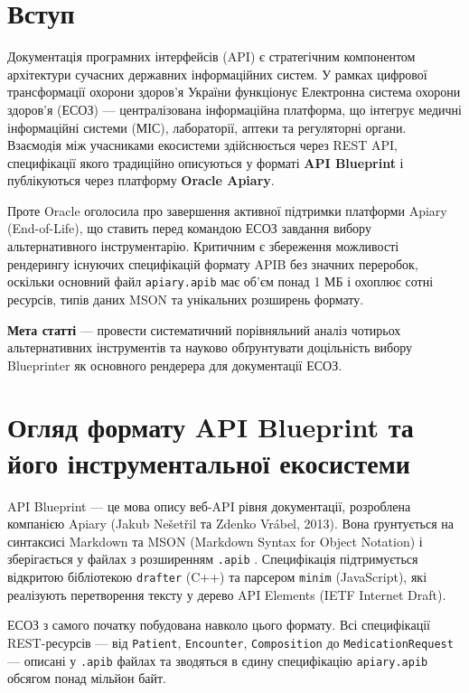 \documentclass{article}
\begin{document}
\newpage
\tableofcontents

\section{Вступ}
Документація програмних інтерфейсів (API) є стратегічним компонентом архітектури сучасних державних інформаційних систем. У рамках цифрової трансформації охорони здоров'я України функціонує Електронна система охорони здоров'я (ЕСОЗ) — централізована інформаційна платформа, що інтегрує медичні інформаційні системи (МІС), лабораторії, аптеки та регуляторні органи. Взаємодія між учасниками екосистеми здійснюється через REST API, специфікації якого традиційно описуються у форматі \textbf{API Blueprint} і публікуються через платформу \textbf{Oracle Apiary}.

Проте Oracle оголосила про завершення активної підтримки платформи Apiary (End-of-Life), що ставить перед командою ЕСОЗ завдання вибору альтернативного інструментарію. Критичним є збереження можливості рендерингу існуючих специфікацій формату APIB без значних переробок, оскільки основний файл \texttt{apiary.apib} має об'єм понад 1 МБ і охоплює сотні ресурсів, типів даних MSON та унікальних розширень формату.

\textbf{Мета статті} — провести систематичний порівняльний аналіз чотирьох альтернативних інструментів та науково обґрунтувати доцільність вибору Blueprinter як основного рендерера для документації ЕСОЗ.

\section{Огляд формату API Blueprint та його інструментальної екосистеми}
API Blueprint — це мова опису веб-API рівня документації, розроблена компанією Apiary (Jakub Nešetřil та Zdenko Vrábel, 2013). Вона ґрунтується на синтаксисі Markdown та MSON (Markdown Syntax for Object Notation) і зберігається у файлах з розширенням \texttt{.apib} \cite{apiblueprint_spec}. Специфікація підтримується відкритою бібліотекою \texttt{drafter} (C++) та парсером \texttt{minim} (JavaScript), які реалізують перетворення тексту у дерево API Elements (IETF Internet Draft).

ЕСОЗ з самого початку побудована навколо цього формату. Всі специфікації REST-ресурсів — від \texttt{Patient}, \texttt{Encounter}, \texttt{Composition} до \texttt{MedicationRequest} — описані у \texttt{.apib} файлах та зводяться в єдину специфікацію \texttt{apiary.apib} обсягом понад мільйон байт.
\end{document}
